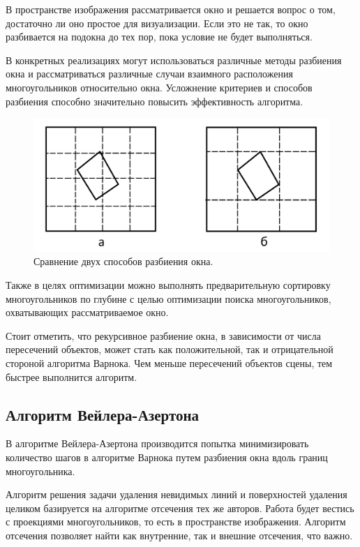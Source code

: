 В пространстве изображения рассматривается окно и решается вопрос о том, достаточно ли оно простое для визуализации. Если это не так, то окно разбивается на подокна до тех пор, пока условие не будет выполняться. 

В конкретных реализациях могут использоваться различные методы разбиения окна и рассматриваться различные случаи взаимного расположения многоугольников относительно окна. Усложнение критериев и способов разбиения способно значительно повысить эффективность алгоритма. 

\begin{figure}[h]
	\centering
	\includegraphics[width=\textwidth ]{img/subdivide.png}
	\caption{Сравнение двух способов разбиения окна.}
\end{figure} 

Также в целях оптимизации можно выполнять предварительную сортировку многоугольников по глубине с целью оптимизации поиска многоугольников, охватывающих рассматриваемое окно.

Стоит отметить, что рекурсивное разбиение окна, в зависимости от числа пересечений объектов, может стать как положительной, так и отрицательной стороной алгоритма Варнока. Чем меньше пересечений объектов сцены, тем быстрее выполнится алгоритм.

\subsection{Алгоритм Вейлера-Азертона}
В алгоритме Вейлера-Азертона  производится попытка минимизировать количество шагов в алгоритме Варнока путем разбиения окна вдоль границ многоугольника.

Алгоритм решения задачи удаления невидимых линий и поверхностей удаления целиком базируется на алгоритме отсечения тех же авторов. Работа будет вестись с проекциями многоугольников, то есть в пространстве изображения. Алгоритм отсечения позволяет найти как внутренние, так и внешние отсечения, что важно.

